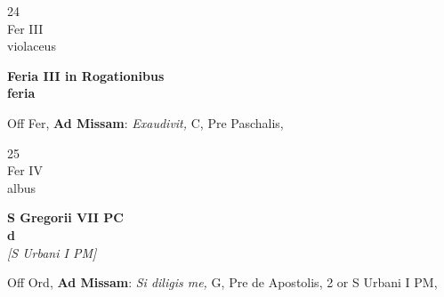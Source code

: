 \documentclass[10pt, openany]{book}
\begin{document}
        \begin{center}
            \begin{minipage}{3.5in}
                \vspace{2em}
                \begin{minipage}{0.5in}
                    {\Huge 24} \\
                    {\normalsize Fer III} \\
                    {\normalsize violaceus}
                \end{minipage}
                \begin{minipage}{3.0in}
                    \textbf{ \large Feria III in Rogationibus \\
                    \textnormal{\normalsize feria}} \\ 
                \end{minipage}
                \begin{justify}Off Fer, \textbf{Ad Missam}: \textit{Exaudivit,} C, Pre Paschalis,  
                \end{justify}
            \end{minipage}
        \end{center}
    
        \begin{center}
            \begin{minipage}{3.5in}
                \vspace{2em}
                \begin{minipage}{0.5in}
                    {\Huge 25} \\
                    {\normalsize Fer IV} \\
                    {\normalsize albus}
                \end{minipage}
                \begin{minipage}{3.0in}
                    \textbf{ \large S Gregorii VII PC \\
                    \textnormal{\normalsize d}} \\ \textit{[S Urbani I PM]} \\ 
                \end{minipage}
                \begin{justify}Off Ord, \textbf{Ad Missam}: \textit{Si diligis me,} G, Pre de Apostolis, 2 or S Urbani I PM,  
                \end{justify}
            \end{minipage}
        \end{center}
    
\end{document}
